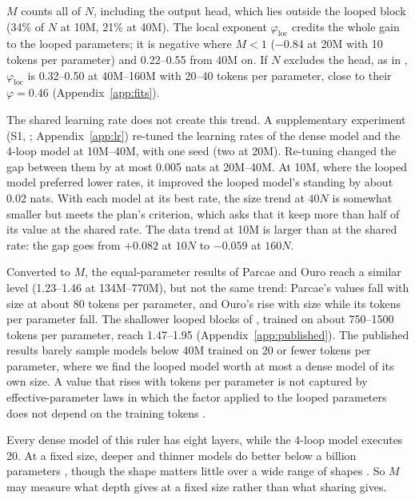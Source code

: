 $M$ counts all of $N$, including the output head, which lies outside the looped block (34\% of $N$ at 10M, 21\% at
40M). The local exponent $\varphi_{\mathrm{loc}}$ credits the whole gain to the looped parameters; it is negative where
$M < 1$ ($-0.84$ at 20M with 10 tokens per parameter) and 0.22--0.55 from 40M on. If $N$ excludes the head, as in
\citet{schwethelm2026how}, $\varphi_{\mathrm{loc}}$ is 0.32--0.50 at 40M--160M with 20--40 tokens per parameter, close
to their $\varphi = 0.46$ (Appendix~\ref{app:fits}).

The shared learning rate does not create this trend. A supplementary experiment (S1, ;
Appendix~\ref{app:lr}) re-tuned the learning rates of the dense model and the 4-loop model at 10M--40M, with one seed
(two at 20M). Re-tuning changed the gap between them by at most 0.005 nats at 20M--40M. At 10M, where the looped
model preferred lower rates, it improved the looped model's standing by about 0.02 nats. With each model at its best
rate, the size trend at $40N$ is somewhat smaller but meets the plan's criterion, which asks that it keep more than half of its value at the shared rate. The data trend at 10M is larger than at the shared rate: the gap goes from $+0.082$ at $10N$ to $-0.059$ at
$160N$.

Converted to $M$, the equal-parameter results of Parcae \citep{prairie2026parcae} and Ouro \citep{zhu2025scaling}
reach a similar level (1.23--1.46 at 134M--770M), but not the same trend: Parcae's values fall with size at about 80
tokens per parameter, and Ouro's rise with size while its tokens per parameter fall. The shallower looped blocks of
\citet{saunshi2025reasoning}, trained on about 750--1500 tokens per parameter, reach 1.47--1.95
(Appendix~\ref{app:published}). The published results barely sample models below 40M trained on 20 or fewer tokens per parameter, where we find the looped model worth at most a dense model of its own size. A value that rises with tokens per parameter is not captured by effective-parameter laws in which the factor applied to
the looped parameters does not depend on the training tokens \citep{schwethelm2026how,chen2026moe}.

Every dense model of this ruler has eight layers, while the 4-loop model executes 20. At a fixed size, deeper and thinner
models do better below a billion parameters \citep{liu2024mobilellm}, though the shape matters little over a wide range
of shapes \citep{kaplan2020scaling}. So $M$ may measure what depth gives at a fixed size rather than what sharing gives.

